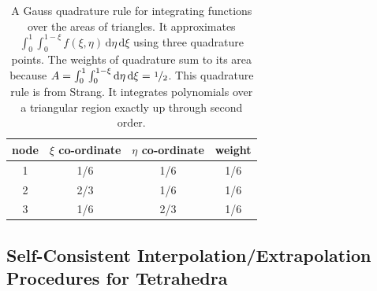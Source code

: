 \begin{table}
    \begin{center}
    \begin{tabular}{|c|ccc|}
        \hline
        node & $\xi$ co-ordinate & $\eta$ co-ordinate  & weight \\ \hline        
        1 & 1/6 & 1/6 & 1/6 \\ 
        2 & 2/3 & 1/6 & 1/6 \\ 
        3 & 1/6 & 2/3 & 1/6 \\ 
        \hline
    \end{tabular}
    \end{center}
    \caption{A Gauss quadrature rule for integrating functions over the areas of triangles.  It approximates $\int_0^1 \int_0^{1-\xi} f(\xi , \eta) \, \mathrm{d} \eta \, \mathrm{d} \xi$  using three quadrature points.  The weights of quadrature sum to its area because $A = \int_0^1 \int_0^{1-\xi} \mathrm{d}\eta \, \mathrm{d} \xi = \textfrac{1}{2}$.  This quadrature rule is from Strang.  It integrates polynomials over a triangular region exactly up through second order.}
    \label{tab:3nodeTriangle}
\end{table}
    
\subsection{Self-Consistent Interpolation\slash Extrapolation Procedures for Tetrahedra}
    
